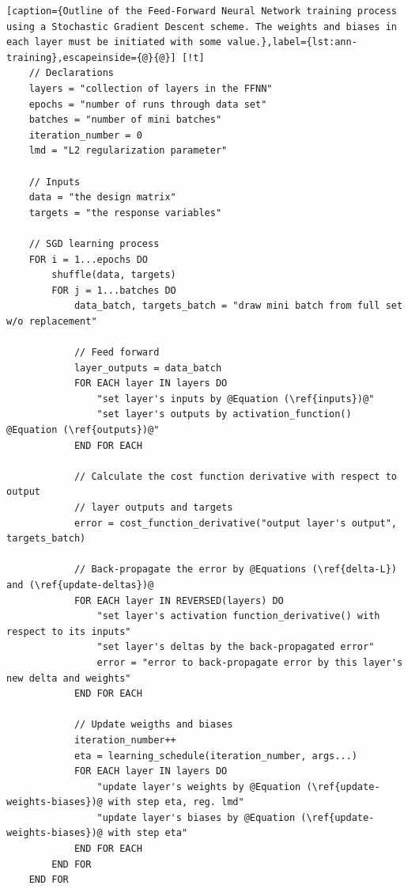 \documentclass[]{article}
\begin{document}
	\begin{lstlisting}[caption={Outline of the Feed-Forward Neural Network training process using a Stochastic Gradient Descent scheme. The weights and biases in each layer must be initiated with some value.},label={lst:ann-training},escapeinside={@}{@}] [!t]
	// Declarations
	layers = "collection of layers in the FFNN"
	epochs = "number of runs through data set"
	batches = "number of mini batches"
	iteration_number = 0
	lmd = "L2 regularization parameter"
	
	// Inputs
	data = "the design matrix"
	targets = "the response variables"
	
	// SGD learning process
	FOR i = 1...epochs DO
		shuffle(data, targets)
		FOR j = 1...batches DO
			data_batch, targets_batch = "draw mini batch from full set w/o replacement"
			
			// Feed forward
			layer_outputs = data_batch			
			FOR EACH layer IN layers DO
				"set layer's inputs by @Equation (\ref{inputs})@"
				"set layer's outputs by activation_function() @Equation (\ref{outputs})@"
			END FOR EACH
			
			// Calculate the cost function derivative with respect to output
			// layer outputs and targets
			error = cost_function_derivative("output layer's output", targets_batch)
			
			// Back-propagate the error by @Equations (\ref{delta-L}) and (\ref{update-deltas})@
			FOR EACH layer IN REVERSED(layers) DO
				"set layer's activation function_derivative() with respect to its inputs"
				"set layer's deltas by the back-propagated error"
				error = "error to back-propagate error by this layer's new delta and weights"
			END FOR EACH		
			
			// Update weigths and biases
			iteration_number++
			eta = learning_schedule(iteration_number, args...)
			FOR EACH layer IN layers DO
				"update layer's weights by @Equation (\ref{update-weights-biases})@ with step eta, reg. lmd"
				"update layer's biases by @Equation (\ref{update-weights-biases})@ with step eta"
			END FOR EACH
		END FOR
	END FOR
	\end{lstlisting}
\end{document}
